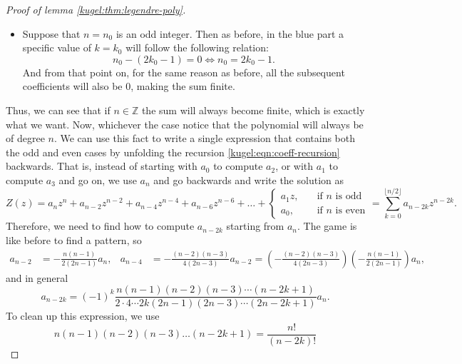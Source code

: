 \begin{proof}[Proof of lemma \ref{kugel:thm:legendre-poly}]
\begin{itemize}
    \item[\textcolor{blue!80!black}{\textbullet}]
      Suppose that $n=n_0$ is an odd integer. Then as before, in the blue part a
      specific value of $k=k_0$ will follow the following relation:
      \begin{equation*}
        n_0-(2k_0-1)=0
        \iff
        n_0 = 2k_0 - 1.
      \end{equation*}
      And from that point on, for the same reason as before, all the subsequent
      coefficients will also be 0, making the sum finite.
  \end{itemize} 

  Thus, we can see that if $n \in \mathbb{Z}$ the sum will always become finite,
  which is exactly what we want. Now, whichever the case notice that the
  polynomial will always be of degree $n$. We can use this fact to write a
  single expression that contains both the odd and even cases by unfolding the
  recursion \eqref{kugel:eqn:coeff-recursion} backwards. That is, instead of
  starting with $a_0$ to compute $a_2$, or with $a_1$ to compute $a_3$ and go
  on, we use $a_n$ and go backwards and write the solution as
  \begin{equation*}
    Z(z) = a_n z^n + a_{n-2} z^{n-2} + a_{n-4} z^{n-4} 
      + a_{n-6} z^{n-6} + \hdots +
      \begin{cases} 
        a_1 z, \quad &\text{if } n \text{ is odd} \\ 
        a_0, \quad  &\text{if } n \text{ is even} 
      \end{cases}
      = \sum_{k=0}^{\lfloor n/2 \rfloor} a_{n-2k}z^{n-2k}.
  \end{equation*}
  Therefore, we need to find how to compute $a_{n - 2k}$ starting from $a_n$.
  The game is like before to find a pattern, so
  \begin{align*}
    a_{n-2} &= -\frac{n(n-1)}{2(2n-1)}a_n, &
    a_{n-4} &= -\frac{(n-2)(n-3)}{4(2n-3)}a_{n-2}
    = \left(
        -\frac{(n-2)(n-3)}{4(2n-3)}
      \right) \left(
        -\frac{n(n-1)}{2(2n-1)}
      \right) a_n,
  \end{align*}
  and in general 
  \begin{equation*}
    a_{n-2k} = (-1)^k \frac{
      n(n-1)(n-2)(n-3) \cdots (n-2k+1)
    }{
      2 \cdot 4 \cdots 2k(2n-1)(2n-3) \cdots (2n-2k+1)
    } a_n.
  \end{equation*}
  To clean up this expression, we use
  \begin{equation*}
    n(n-1)(n-2)(n-3) \hdots (n-2k+1)
    = \frac{n!}{(n-2k)!}

\end{equation*}
\end{proof}
